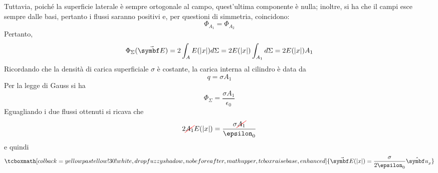 Tuttavia, poiché la superficie laterale è sempre ortogonale al campo, quest'ultima componente è nulla; inoltre, si ha che il campi esce sempre dalle basi, pertanto i flussi saranno positivi e, per questioni di simmetria, coincidono:
\begin{equation*}
	\Phi_{A_1}=\Phi_{A_2}
\end{equation*}
Pertanto,
\begin{equation*}
	\Phi_{\Sigma}(\vba{E})=2\int_A E(\abs{x})d\Sigma=2 E(\abs{x})\int_{A_1}d\Sigma=2E(\abs{x})A_1
\end{equation*}
Ricordando che la densità di carica superficiale $\sigma$ è costante, la carica interna al cilindro è data da
\begin{equation*}
	q=\sigma A_1
\end{equation*}
Per la legge di Gauss si ha
\begin{equation*}
	\Phi_{\Sigma}=\frac{\sigma A_1}{\epsilon_0}
\end{equation*}
Eguagliando i due flussi ottenuti si ricava che
\begin{equation*}
	2\Ccancel[red]{A_1}E(\abs{x})=\frac{\sigma \Ccancel[red]{A_1}}{\epsilon_0}
\end{equation*}
e quindi
\begin{equation}
	\tcboxmath[colback=yellowpastellow!30!white,drop fuzzy shadow, nobeforeafter, math upper, tcbox raise base, enhanced]{\vba{E}(\abs{x})=\frac{\sigma}{2\epsilon_0}\vbh{u}_x}
\end{equation}
